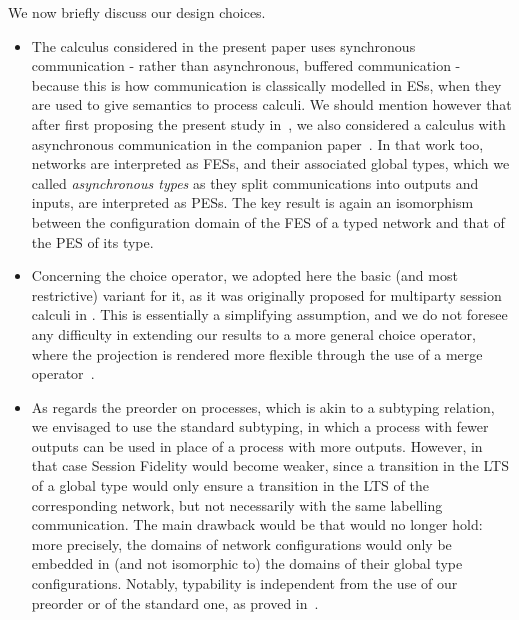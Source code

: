  
We now briefly discuss our design choices. 
\begin{itemize}
\item  The calculus
considered in the present paper  uses synchronous communication -
rather than asynchronous, buffered communication - because this is how
communication is  classically  modelled in ESs, when they
are used to give semantics to process calculi.   We should
mention however that after first proposing the present study
in~\cite{CDG-LNCS19}, we also considered a calculus with asynchronous
communication in the companion paper~\cite{CDG21}.  In that work too,
networks are interpreted as FESs, and their associated global types,
which we called \emph{asynchronous types} as they split communications
into outputs and inputs, are interpreted as PESs.  The key result is
again an isomorphism between the configuration domain of the FES of a
typed network and that of the PES of its type.  
%
\item Concerning the choice operator, we adopted here the basic (and
  most restrictive) variant for it, as it was originally proposed for
  multiparty session calculi in \cite{CHY08}.
This is essentially a simplifying assumption, and we do not foresee any difficulty in extending our results
to a more general choice operator,
where the projection is rendered more flexible through the use of  a merge operator~\cite{DY11}. 
%
\item 
 As regards the preorder on processes, which is akin to a subtyping relation, we envisaged to use the
standard subtyping,  in which a process with fewer outputs
 can be used in place of 
 a process with more outputs.  However, in that case Session Fidelity
 would become weaker, since a transition in the LTS of a global type
 would only ensure a transition in the LTS of the corresponding
 network, but not necessarily with the same labelling communication.
 The main drawback would be that  would no longer
 hold: more precisely, the domains of network configurations would
 only be embedded in (and not isomorphic to) the domains of their
 global type configurations. Notably, typability is independent from
 the use of our preorder or of the standard one, as proved
 in~\cite{BDLT21}.
\end{itemize}

